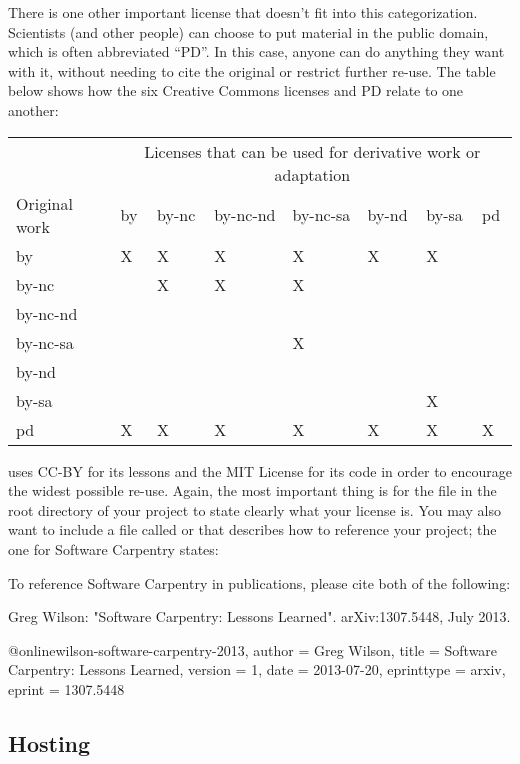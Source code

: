 There is one other important license that doesn't fit into this
categorization. Scientists (and other people) can choose to put material
in the public domain, which is often abbreviated ``PD''. In this case,
anyone can do anything they want with it, without needing to cite the
original or restrict further re-use. The table below shows how the six
Creative Commons licenses and PD relate to one another:

\begin{tabular}{llllllll}
& \multicolumn{7}{c}{Licenses that can be used for derivative work or adaptation} \\
Original work & by & by-nc & by-nc-nd & by-nc-sa & by-nd & by-sa & pd \\
by & X & X & X & X & X & X & \\
by-nc & & X & X & X & & & \\
by-nc-nd & & & & & & & \\
by-nc-sa & & & & X & & & \\
by-nd & & & & & & & \\
by-sa & & & & & & X & \\
pd & X & X & X & X & X & X & X \\
\end{tabular}

uses CC-BY for its lessons and the MIT License for its code in order to
encourage the widest possible re-use. Again, the most important thing is
for the  file in the root directory of your project to
state clearly what your license is. You may also want to include a file
called  or  that describes how to
reference your project; the one for Software Carpentry states:

\begin{VerbFile}
To reference Software Carpentry in publications, please cite both of the following:

Greg Wilson: "Software Carpentry: Lessons Learned". arXiv:1307.5448, July 2013.

@online{wilson-software-carpentry-2013,
  author      = {Greg Wilson},
  title       = {Software Carpentry: Lessons Learned},
  version     = {1},
  date        = {2013-07-20},
  eprinttype  = {arxiv},
  eprint      = {1307.5448}
}
\end{VerbFile}

\subsection*{Hosting}


